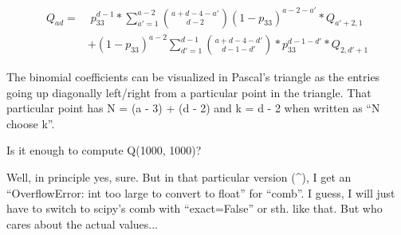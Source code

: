 \documentclass[11pt,a4paper]{article}
\begin{document}
\begin{mdframed}[leftline=true,rightline=false,topline=false,bottomline=false,linewidth=1pt,linecolor=gray,innerleftmargin=20pt,innerrightmargin=5pt,innertopmargin=0pt,innerbottommargin=0pt,leftmargin=20pt]
    \[ \begin{aligned}
    Q_{ad} = &\; p_{33}^{d-1} * \sum_{a'=1}^{a-2} \binom{a + d - 4 - a'}{d - 2}(1 - p_{33})^{a-2-a'} * Q_{a'+2,1} \\
    &+ (1 - p_{33})^{a-2} \sum_{d'=1}^{d-1} \binom{a + d - 4 - d'}{d - 1 - d'} * p_{33}^{d-1-d'} * Q_{2,d'+1}
    \end{aligned} \]

    The binomial coefficients can be visualized in Pascal's triangle as the entries going up diagonally left/right from a particular point in the triangle. That particular point has N = (a - 3) + (d - 2) and k = d - 2 when written as ``N choose k''.

    Is it enough to compute Q(1000, 1000)?

    Well, in principle yes, sure.
    But in that particular version (\^{}), I get an ``OverflowError: int too large to convert to float'' for ``comb''.
    I guess, I will just have to switch to scipy's comb with ``exact=False'' or sth. like that.
    But who cares about the actual values...
    \end{mdframed}
\end{document}
